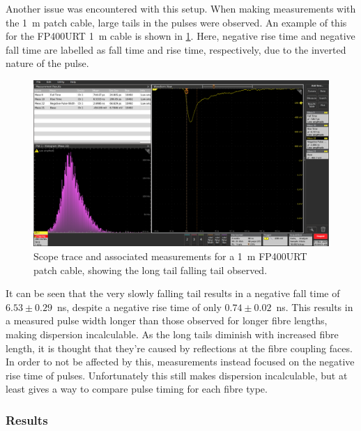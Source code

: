 \documentclass[a4paper,11pt]{article}
\begin{document}
Another issue was encountered with this setup. When making measurements with the 1~m patch cable, large tails in the pulses were observed. An example of this for the FP400URT 1~m cable is shown in \cref{fig:fp400urt1m}. Here, negative rise time and negative fall time are labelled as fall time and rise time, respectively, due to the inverted nature of the pulse.
\begin{figure}[h]
\centering
\includegraphics[width=\textwidth]{FP400URT_1m_1.png}
\caption{Scope trace and associated measurements for a 1~m FP400URT patch cable, showing the long tail falling tail observed.}\label{fig:fp400urt1m}
\end{figure}
It can be seen that the very slowly falling tail results in a negative fall time of $6.53\pm0.29$~ns, despite a negative rise time of only $0.74\pm0.02$~ns. This results in a measured pulse width longer than those observed for longer fibre lengths, making dispersion incalculable. As the long tails diminish with increased fibre length, it is thought that they're caused by reflections at the fibre coupling faces. In order to not be affected by this, measurements instead focused on the negative rise time of pulses. Unfortunately this still makes dispersion incalculable, but at least gives a way to compare pulse timing for each fibre type.

\subsubsection{Results}\label{sec:fibre:sub:disp:sub:method}
\end{document}
